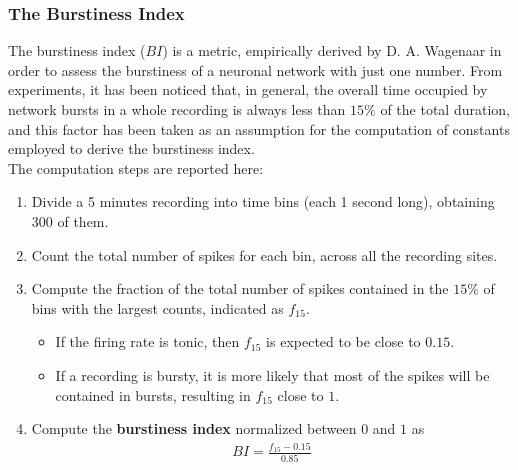 \subsubsection{The Burstiness Index}
The burstiness index (\(BI\)) is a metric, empirically derived by D. A. Wagenaar in order to assess the burstiness
of a neuronal network with just one number. From experiments, it has been noticed that,
in general, the overall time occupied by network bursts in a whole recording is
always less than \(15\%\) of the total duration, and this factor has been taken as an
assumption for the computation of constants employed to derive the burstiness
index.\\ 
The computation steps are reported here:
\begin{enumerate}
    \item Divide a 5 minutes recording into time bins (each 1 second long), obtaining 300 of them.
    \item Count the total number of spikes for each bin, across all the recording sites.
    \item Compute the fraction of the total number of spikes contained in the \(15\%\)
          of bins with the largest counts, indicated as \(f_{15}\).
          \begin{itemize}
              \item If the firing rate is tonic, then \(f_{15}\) is expected to be close to \(0.15\).
              \item If a recording is bursty, it is more likely that most of the spikes will
                    be contained in bursts, resulting in \(f_{15}\) close to \(1\).
          \end{itemize}
    \item Compute the \textbf{burstiness index} normalized between \(0\) and \(1\) as
          \begin{align*}
              BI = \frac{f_{15}-0.15}{0.85}
          \end{align*}
\end{enumerate}
